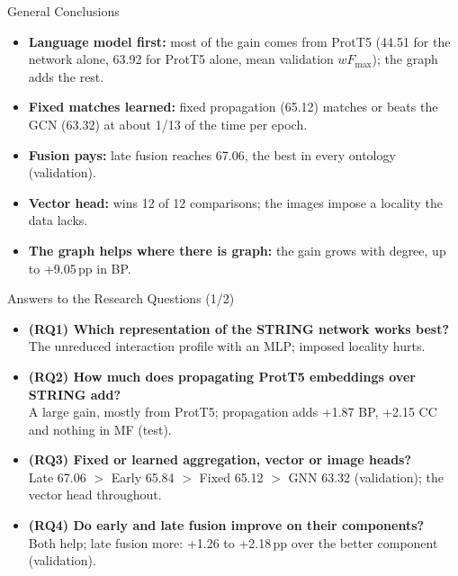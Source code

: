 \documentclass[aspectratio=169,11pt]{beamer}
\newcommand{\wF}{wF_{\max}}
\begin{document}
\begin{frame}{General Conclusions}
  \begin{itemize}\setlength{\itemsep}{0.45em}\small
    \item \textbf{Language model first:} most of the gain comes from ProtT5 (44.51 for the network alone, 63.92 for
      ProtT5 alone, mean validation $\wF$); the graph adds the rest.
    \item \textbf{Fixed matches learned:} fixed propagation (65.12) matches or beats the GCN (63.32) at about 1/13 of
      the time per epoch.
    \item \textbf{Fusion pays:} late fusion reaches 67.06, the best in every ontology (validation).
    \item \textbf{Vector head:} wins 12 of 12 comparisons; the images impose a locality the data lacks.
    \item \textbf{The graph helps where there is graph:} the gain grows with degree, up to +9.05\,pp in BP.
  \end{itemize}
\end{frame}

\begin{frame}{Answers to the Research Questions (1/2)}
  \begin{itemize}\setlength{\itemsep}{0.55em}\small
    \item \textbf{(RQ1) Which representation of the STRING network works best?}\\
      The unreduced interaction profile with an MLP; imposed locality hurts.
    \item \textbf{(RQ2) How much does propagating ProtT5 embeddings over STRING add?}\\
      A large gain, mostly from ProtT5; propagation adds +1.87 BP, +2.15 CC and nothing in MF (test).
    \item \textbf{(RQ3) Fixed or learned aggregation, vector or image heads?}\\
      Late 67.06 $>$ Early 65.84 $>$ Fixed 65.12 $>$ GNN 63.32 (validation); the vector head throughout.
    \item \textbf{(RQ4) Do early and late fusion improve on their components?}\\
      Both help; late fusion more: +1.26 to +2.18\,pp over the better component (validation).
  \end{itemize}
\end{frame}
\end{document}
